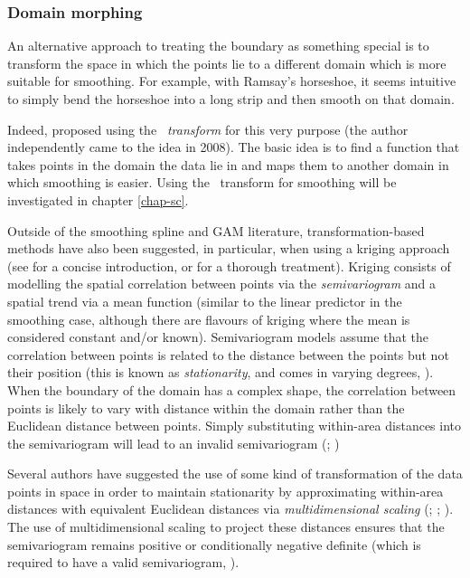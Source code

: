 \subsubsection{Domain morphing}

An alternative approach to treating the boundary as something special is to transform the space in which the points lie to a different domain which is more suitable for smoothing. For example, with Ramsay's horseshoe, it seems intuitive to simply bend the horseshoe into a long strip and then smooth on that domain.

\label{cor-3s2}Indeed,  proposed using the \textit{\sch\ transform} for this very purpose (the author independently came to the idea in 2008). The basic idea is to find a function that takes points in the domain the data lie in and maps them to another domain in which smoothing is easier. Using the \sch\ transform for smoothing will be investigated in chapter \ref{chap-sc}.

Outside of the smoothing spline and GAM literature, transformation-based methods have also been suggested, in particular, when using a kriging approach (see  for a concise introduction,  or  for a thorough treatment). Kriging consists of modelling the spatial correlation between points via the \textit{semivariogram} and a spatial trend via a mean function (similar to the linear predictor in the smoothing case, although there are flavours of kriging where the mean is considered constant and/or known). Semivariogram models assume that the correlation between points is related to the distance between the points but not their position (this is known as \textit{stationarity}, and comes in varying degrees, ). When the boundary of the domain has a complex shape, the correlation between points is likely to vary with distance within the domain rather than the Euclidean distance between points. Simply substituting within-area distances into the semivariogram will lead to an invalid semivariogram (; \cite{curriero})

Several authors have suggested the use of some kind of transformation of the data points in space in order to maintain stationarity by approximating within-area distances with equivalent Euclidean distances via \textit{multidimensional scaling} (\cite{mdskrig}; \cite{crabkrig}; \cite{curriero}). The use of multidimensional scaling to project these distances ensures that the semivariogram remains positive or conditionally negative definite (which is required to have a valid semivariogram, ).

